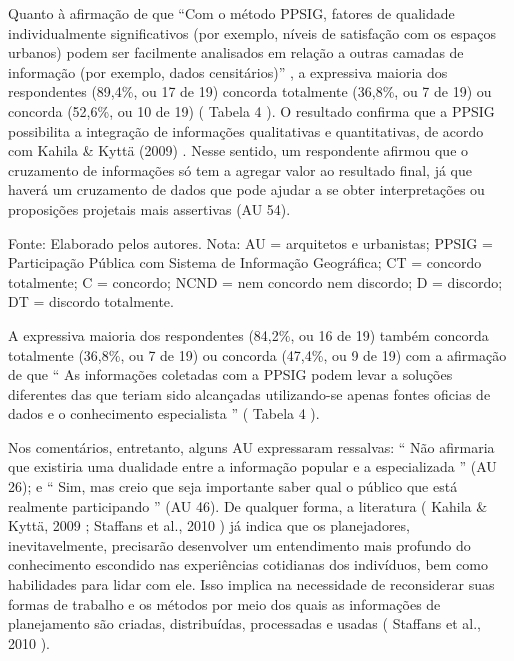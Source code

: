 \documentclass{article}
\begin{document}
Quanto à afirmação de que %
“Com o método PPSIG, fatores de qualidade
						individualmente significativos (por exemplo, níveis de satisfação com os
						espaços urbanos) podem ser facilmente analisados em relação a outras camadas
						de informação (por exemplo, dados censitários)”%
, a expressiva
					maioria dos respondentes (89,4\%, ou 17 de 19) concorda totalmente (36,8\%, ou 7
					de 19) ou concorda (52,6\%, ou 10 de 19) (%
Tabela
						4%
). O resultado confirma que a PPSIG possibilita a integração de
					informações qualitativas e quantitativas, de acordo com %
Kahila \& Kyttä (2009)%
. Nesse sentido, um respondente
					afirmou que o cruzamento de informações só tem a agregar valor ao resultado
					final, já que haverá um cruzamento de dados que pode ajudar a se obter
					interpretações ou proposições projetais mais assertivas (AU 54).

Fonte: Elaborado pelos autores. Nota: AU = arquitetos e urbanistas;
								PPSIG = Participação Pública com Sistema de Informação Geográfica;
								CT = concordo totalmente; C = concordo; NCND = nem concordo nem
								discordo; D = discordo; DT = discordo totalmente.

A expressiva maioria dos respondentes (84,2\%, ou 16 de 19) também concorda
					totalmente (36,8\%, ou 7 de 19) ou concorda (47,4\%, ou 9 de 19) com a afirmação
					de que “%
As informações coletadas com a PPSIG podem levar a soluções
						diferentes das que teriam sido alcançadas utilizando-se apenas fontes
						oficias de dados e o conhecimento especialista%
” (%
Tabela 4%
).

Nos comentários, entretanto, alguns AU expressaram ressalvas: “%
Não
						afirmaria que existiria uma dualidade entre a informação popular e a
						especializada%
” (AU 26); e “%
Sim, mas creio que seja
						importante saber qual o público que está realmente participando%
”
					(AU 46). De qualquer forma, a literatura (%
Kahila \& Kyttä, 2009%
; %
Staffans
						et al., 2010%
) já indica que os planejadores, inevitavelmente,
					precisarão desenvolver um entendimento mais profundo do conhecimento escondido
					nas experiências cotidianas dos indivíduos, bem como habilidades para lidar com
					ele. Isso implica na necessidade de reconsiderar suas formas de trabalho e os
					métodos por meio dos quais as informações de planejamento são criadas,
					distribuídas, processadas e usadas (%
Staffans et
						al., 2010%
).
\end{document}

